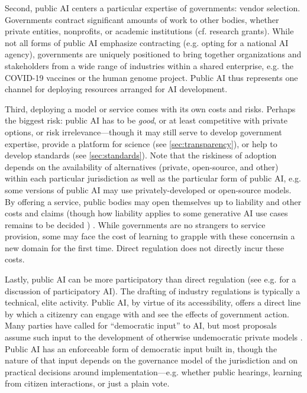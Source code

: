 \documentclass{article}
\begin{document}
Second, public AI centers a particular expertise of governments: vendor selection. Governments contract significant amounts of work to other bodies, whether private entities, nonprofits, or academic institutions (cf. research grants). While not all forms of public AI emphasize contracting (e.g. opting for a national AI agency), governments are uniquely positioned to bring together organizations and stakeholders from a wide range of industries within a shared enterprise, e.g. the COVID-19 vaccines or the human genome project. Public AI thus represents one channel for deploying resources arranged for AI development. 



Third, deploying a model or service comes with its own costs and risks. Perhaps the biggest risk: public AI has to be \emph{good}, or at least competitive with private options, or risk irrelevance---though it may still serve to develop government expertise, provide a platform for science (see \cref{sec:transparency}), or help to develop standards (see \cref{sec:standards}). 
Note that the riskiness of adoption depends on the availability of alternatives (private, open-source, and other) within each particular jurisdiction as well as the particular form of public AI, e.g. some versions of public AI may use privately-developed or open-source models. 
By offering a service, public bodies may open themselves up to liability and other costs and claims (though how liability applies to some generative AI use cases remains to be decided \cite{walshLegalIssuesPresented2023}) . While governments are no strangers to service provision, some may face the cost of learning to grapple with these concernsin a new domain for the first time. Direct regulation does not directly incur these costs.

Lastly, public AI can be more participatory than direct regulation (see e.g. \citeauthor{delgadoParticipatoryTurnAI2023} \cite{delgadoParticipatoryTurnAI2023} for a discussion of participatory AI). The drafting of industry regulations is typically a technical, elite activity. Public AI, by virtue of its accessibility, offers a direct line by which a citizenry can engage with and see the effects of government action. Many parties have called for ``democratic input'' to AI, but most proposals assume such input to the development of otherwise undemocratic private models \cite{zarembaDemocraticInputsAI2023}. Public AI has an enforceable form of democratic input built in, though the nature of that input depends on the governance model of the jurisdiction and on practical decisions around implementation---e.g. whether public hearings, learning from citizen interactions, or just a plain vote.
\end{document}
